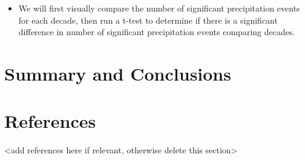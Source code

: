 \documentclass[
  12pt,
]{article}
\providecommand{\tightlist}{%
  \setlength{\itemsep}{0pt}\setlength{\parskip}{0pt}}
\begin{document}
\begin{itemize}
\tightlist
\item
  We will first visually compare the number of significant precipitation
  events for each decade, then run a t-test to determine if there is a
  significant difference in number of significant precipitation events
  comparing decades.
\end{itemize}

\newpage

\hypertarget{summary-and-conclusions}{%
\section{Summary and Conclusions}\label{summary-and-conclusions}}

\newpage

\hypertarget{references}{%
\section{References}\label{references}}

\textless add references here if relevant, otherwise delete this
section\textgreater{}
\end{document}
